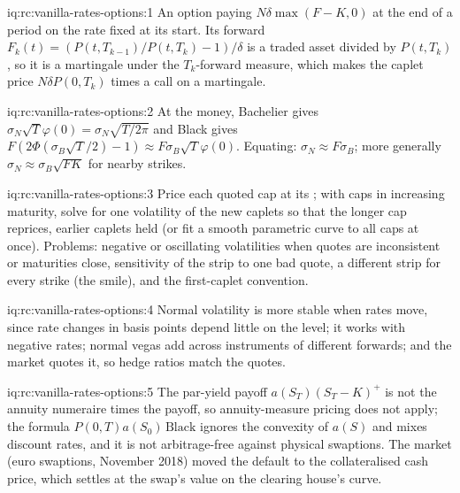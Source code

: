 \begin{solution}{iq:rc:vanilla-rates-options:1}
An option paying $N\delta\max(F-K,0)$ at the end of a period on the rate fixed at
its start. Its forward $F_k(t) = (P(t,T_{k-1})/P(t,T_k)-1)/\delta$ is a traded
asset divided by $P(t,T_k)$, so it is a martingale under the $T_k$-forward
measure, which makes the caplet price $N\delta P(0,T_k)$ times a call on a
martingale.
\end{solution}

\begin{solution}{iq:rc:vanilla-rates-options:2}
At the money, Bachelier gives $\sigma_N\sqrt{T}\varphi(0) = \sigma_N\sqrt{T/2\pi}$
and Black gives $F(2\Phi(\sigma_B\sqrt T/2)-1)\approx F\sigma_B\sqrt{T}\varphi(0)$.
Equating: $\sigma_N\approx F\sigma_B$; more generally $\sigma_N\approx\sigma_B\sqrt{FK}$
for nearby strikes.
\end{solution}

\begin{solution}{iq:rc:vanilla-rates-options:3}
Price each quoted cap at its ; with caps in increasing maturity,
solve for one volatility of the new caplets so that the longer cap reprices,
earlier caplets held (or fit a smooth parametric curve to all caps at once).
Problems: negative or oscillating volatilities when quotes are inconsistent or
maturities close, sensitivity of the strip to one bad quote, a different strip
for every strike (the smile), and the first-caplet convention.
\end{solution}

\begin{solution}{iq:rc:vanilla-rates-options:4}
Normal volatility is more stable when rates move, since rate changes in basis
points depend little on the level; it works with negative rates; normal vegas
add across instruments of different forwards; and the market quotes it, so hedge
ratios match the quotes.
\end{solution}

\begin{solution}{iq:rc:vanilla-rates-options:5}
The par-yield payoff $a(S_T)(S_T-K)^+$ is not the annuity numeraire times the
payoff, so annuity-measure pricing does not apply; the formula
$P(0,T)a(S_0)\,\mathrm{Black}$ ignores the convexity of $a(S)$ and mixes
discount rates, and it is not arbitrage-free against physical swaptions. The
market (euro swaptions, November 2018) moved the default to the collateralised
cash price, which settles at the swap's value on the clearing house's curve.
\end{solution}

